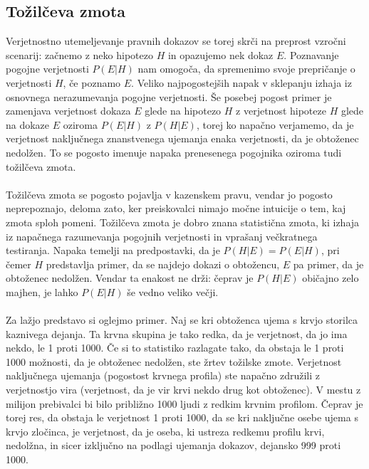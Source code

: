 \documentclass[mat1, tisk]{fmfdelo}
\theoremstyle{definition} %
\theoremstyle{trditev} %
\theoremstyle{izrek}
\begin{document}
\subsection{Tožilčeva zmota}
Verjetnostno utemeljevanje pravnih dokazov se torej skrči na preprost vzročni scenarij: začnemo z neko hipotezo $H$ in opazujemo nek dokaz $E$.
Poznavanje pogojne verjetnosti $P(E \lvert H)$ nam omogoča, da spremenimo svoje prepričanje o verjetnosti $H$, če poznamo $E$. Veliko najpogostejših
napak v sklepanju izhaja iz osnovnega nerazumevanja pogojne verjetnosti. Še posebej pogost primer je zamenjava verjetnost dokaza $E$ glede na
hipotezo $H$ z verjetnost hipoteze $H$ glede na dokaze $E$ oziroma $P(E \lvert H)$ z $P(H \lvert E)$, torej ko napačno verjamemo, da je verjetnost 
naključnega znanstvenega ujemanja enaka verjetnosti, da je obtoženec nedolžen. To se pogosto imenuje napaka prenesenega pogojnika oziroma tudi 
tožilčeva zmota.\\\\
Tožilčeva zmota se pogosto pojavlja v kazenskem pravu, vendar jo pogosto neprepoznajo, deloma zato, ker preiskovalci
nimajo močne intuicije o tem, kaj zmota sploh pomeni. Tožilčeva zmota je dobro znana statistična zmota, ki izhaja iz napačnega razumevanja
pogojnih verjetnosti in vprašanj večkratnega testiranja. Napaka temelji na predpostavki, da je $P(H \lvert E) = P(E \lvert H)$, pri čemer $H$
predstavlja primer, da se najdejo dokazi o obtožencu, $E$ pa primer, da je obtoženec nedolžen. Vendar ta enakost ne drži: čeprav je $P(H \lvert E)$
običajno zelo majhen, je lahko $P(E \lvert H)$ še vedno veliko večji. \\\\
Za lažjo predstavo si oglejmo primer. Naj se kri obtoženca ujema s krvjo storilca kaznivega dejanja. Ta krvna skupina je tako redka, 
da je verjetnost, da jo ima nekdo, le 1 proti 1000. Če si to statistiko razlagate tako, da obstaja le 1 proti 1000 možnosti, da je obtoženec 
nedolžen, ste žrtev tožilske zmote. Verjetnost naključnega ujemanja (pogostost krvnega profila) ste napačno združili z verjetnostjo vira (verjetnost, 
da je vir krvi nekdo drug kot obtoženec). V mestu z milijon prebivalci bi bilo približno 1000 ljudi z redkim krvnim profilom. Čeprav je torej 
res, da obstaja le verjetnost 1 proti 1000, da se kri naključne osebe ujema s krvjo zločinca, je verjetnost, da je oseba, ki ustreza redkemu 
profilu krvi, nedolžna, in sicer izključno na podlagi ujemanja dokazov, dejansko 999 proti 1000. \\\\
\end{document}

